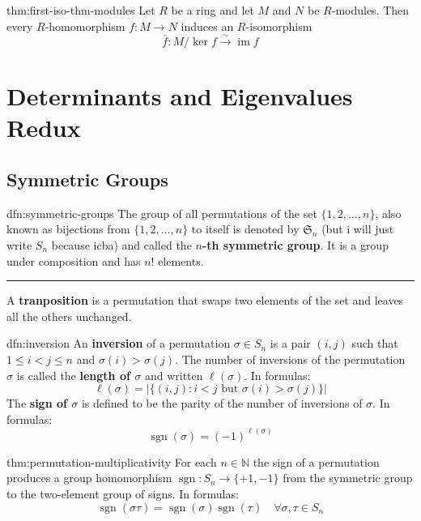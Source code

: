 \documentclass[landscape, 8pt]{extarticle}
\DeclareMathOperator{\im}{im}
\DeclareMathOperator{\sgn}{sgn}
\begin{document}
\begin{multicols}{3}
\begin{thm}{thm:first-iso-thm-modules}{}
    Let $R$ be a ring and let $M$ and $N$ be $R$-modules. Then every $R$-homomorphism $f : M\to N$ induces an $R$-isomorphism
    \[\overline{f} : M / \ker f \xrightarrow{\sim} \im f\]
\end{thm}

\section{Determinants and Eigenvalues Redux}

\subsection{Symmetric Groups}

\begin{dfn}{dfn:symmetric-groups}{}
    The group of all permutations of the set $\{1,2,\dots,n\}$, also known as bijections from $\{1,2,\dots,n\}$ to itself is denoted by $\mathfrak{S}_{n}$ (but i will just write $S_{n}$ because icba) and called the \textbf{$n$-th symmetric group}. It is a group under composition and has $n!$ elements.

    \noindent\rule{\textwidth}{0.2pt}
    A \textbf{tranposition} is a permutation that swaps two elements of the set and leaves all the others unchanged.
\end{dfn}

\begin{dfn}{dfn:inversion}{}
    An \textbf{inversion} of a permutation $\sigma\in S_{n}$ is a pair $(i, j)$ such that $1 \le i < j \le n$ and $\sigma(i) > \sigma(j)$. The number of inversions of the permutation $\sigma$ is called the \textbf{length of $\sigma$} and written $\ell(\sigma)$. In formulas:
    \[\ell(\sigma) = \lvert \{(i,j) : i < j \text{ but } \sigma(i) > \sigma(j)\} \rvert\]
    The \textbf{sign of $\sigma$} is defined to be the parity of the number of inversions of $\sigma$. In formulas:
    \[\sgn(\sigma) = (-1)^{\ell(\sigma)}\]
\end{dfn}

\begin{thm}{thm:permutation-multiplicativity}{}
    For each $n\in \mathbb{N}$ the sign of a permutation produces a group homomorphism $\sgn : S_{n} \to \{+1, -1\}$ from the symmetric group to the two-element group of signs. In formulas:
    \[\sgn(\sigma\tau) = \sgn(\sigma)\sgn(\tau) \quad \forall \sigma, \tau\in S_{n}\]
\end{thm}


\end{multicols}
\end{document}
